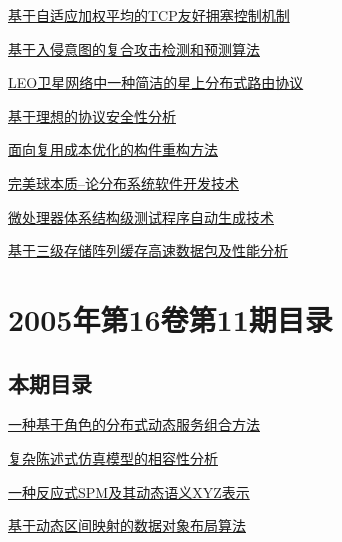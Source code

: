 \documentclass[a4paper]{article}
\begin{document}
\href{http://www.jos.org.cn/ch/reader/download_pdf.aspx?file_no=20051211&year_id=2005&quarter_id=12&falg=1}{基于自适应加权平均的TCP友好拥塞控制机制}

\href{http://www.jos.org.cn/ch/reader/download_pdf.aspx?file_no=20051212&year_id=2005&quarter_id=12&falg=1}{基于入侵意图的复合攻击检测和预测算法}

\href{http://www.jos.org.cn/ch/reader/download_pdf.aspx?file_no=20051213&year_id=2005&quarter_id=12&falg=1}{LEO卫星网络中一种简洁的星上分布式路由协议}

\href{http://www.jos.org.cn/ch/reader/download_pdf.aspx?file_no=20051214&year_id=2005&quarter_id=12&falg=1}{基于理想的协议安全性分析}

\href{http://www.jos.org.cn/ch/reader/download_pdf.aspx?file_no=20051215&year_id=2005&quarter_id=12&falg=1}{面向复用成本优化的构件重构方法}

\href{http://www.jos.org.cn/ch/reader/download_pdf.aspx?file_no=20051216&year_id=2005&quarter_id=12&falg=1}{完美球本质--论分布系统软件开发技术}

\href{http://www.jos.org.cn/ch/reader/download_pdf.aspx?file_no=20051217&year_id=2005&quarter_id=12&falg=1}{微处理器体系结构级测试程序自动生成技术}

\href{http://www.jos.org.cn/ch/reader/download_pdf.aspx?file_no=20051218&year_id=2005&quarter_id=12&falg=1}{基于三级存储阵列缓存高速数据包及性能分析}


\section{\textbf{2005年第16卷第11期目录}}
\subsection{本期目录}
\href{http://www.jos.org.cn/ch/reader/download_pdf.aspx?file_no=20051101&year_id=2005&quarter_id=11&falg=1}{一种基于角色的分布式动态服务组合方法}

\href{http://www.jos.org.cn/ch/reader/download_pdf.aspx?file_no=20051102&year_id=2005&quarter_id=11&falg=1}{复杂陈述式仿真模型的相容性分析}

\href{http://www.jos.org.cn/ch/reader/download_pdf.aspx?file_no=20051103&year_id=2005&quarter_id=11&falg=1}{一种反应式SPM及其动态语义XYZ表示}

\href{http://www.jos.org.cn/ch/reader/download_pdf.aspx?file_no=20051104&year_id=2005&quarter_id=11&falg=1}{基于动态区间映射的数据对象布局算法}
\end{document}
